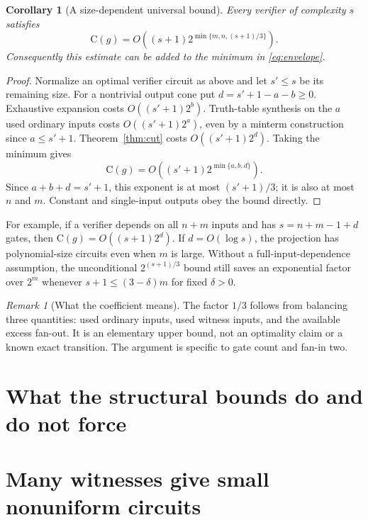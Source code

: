 \documentclass[11pt]{article}
\newtheorem{corollary}[theorem]{Corollary}
\theoremstyle{definition}
\theoremstyle{remark}
\newtheorem{remark}[theorem]{Remark}
\newcommand{\C}{\mathrm{C}}
\begin{document}
\begin{corollary}[A size-dependent universal bound]\label{cor:size-exponent}
Every verifier of complexity $s$ satisfies
\begin{equation}\label{eq:size-exponent}
 \boxed{\quad
 \C(g)=O\!\left((s+1)2^{\min\{m,n,(s+1)/3\}}\right).
 \quad}
\end{equation}
Consequently this estimate can be added to the minimum in
\eqref{eq:envelope}.
\end{corollary}
\begin{proof}
Normalize an optimal verifier circuit as above and let $s'\le s$
be its remaining size. For a nontrivial output cone put
$d=s'+1-a-b\ge0$. Exhaustive expansion costs $O((s'+1)2^b)$.
Truth-table synthesis on the $a$ used ordinary inputs costs
$O((s'+1)2^a)$, even by a minterm construction since $a\le s'+1$.
Theorem~\ref{thm:cut} costs $O((s'+1)2^d)$. Taking the minimum gives
\[
 \C(g)=O((s'+1)2^{\min\{a,b,d\}}).
\]
Since $a+b+d=s'+1$, this exponent is at most $(s'+1)/3$;
it is also at most $n$ and $m$. Constant and single-input outputs
obey the bound directly.
\end{proof}

For example, if a verifier depends on all $n+m$ inputs and has
$s=n+m-1+d$ gates, then $\C(g)=O((s+1)2^d)$. If $d=O(\log s)$,
the projection has polynomial-size circuits even when $m$ is large.
Without a full-input-dependence assumption, the unconditional
$2^{(s+1)/3}$ bound still saves an exponential factor over $2^m$
whenever $s+1\le(3-\delta)m$ for fixed $\delta>0$.

\begin{remark}[What the coefficient means]
The factor $1/3$ follows from balancing three quantities: used ordinary
inputs, used witness inputs, and the available excess fan-out. It is
an elementary upper bound, not an optimality claim or a known exact
transition. The argument is specific to gate count and fan-in two.
\end{remark}




\section{What the structural bounds do and do not force}



\section{Many witnesses give small nonuniform circuits}
\end{document}

